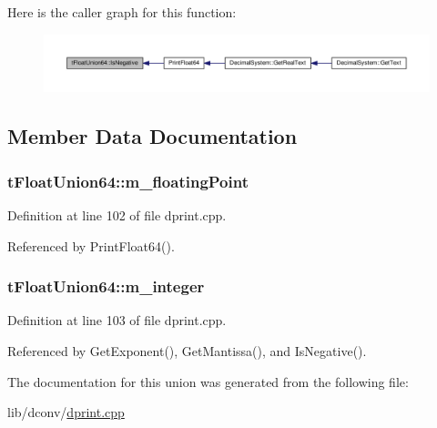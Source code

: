 Here is the caller graph for this function\+:\nopagebreak
\begin{figure}[H]
\begin{center}
\leavevmode
\includegraphics[width=350pt]{uniontFloatUnion64_acef6b9abed06d568b90ed31592e13242_icgraph}
\end{center}
\end{figure}




\subsection{Member Data Documentation}
\subsubsection[{\texorpdfstring{m\+\_\+floating\+Point}{m_floatingPoint}}]{ t\+Float\+Union64\+::m\+\_\+floating\+Point}\hypertarget{uniontFloatUnion64_aac8887130a7750b7ed3e38d2172e0d4d}{}\label{uniontFloatUnion64_aac8887130a7750b7ed3e38d2172e0d4d}


Definition at line 102 of file dprint.\+cpp.



Referenced by Print\+Float64().

\subsubsection[{\texorpdfstring{m\+\_\+integer}{m_integer}}]{ t\+Float\+Union64\+::m\+\_\+integer}\hypertarget{uniontFloatUnion64_a7579348287571c05c408cda342217d91}{}\label{uniontFloatUnion64_a7579348287571c05c408cda342217d91}


Definition at line 103 of file dprint.\+cpp.



Referenced by Get\+Exponent(), Get\+Mantissa(), and Is\+Negative().



The documentation for this union was generated from the following file\+:\begin{DoxyCompactItemize}
\item 
lib/dconv/\hyperlink{dprint_8cpp}{dprint.\+cpp}\end{DoxyCompactItemize}
